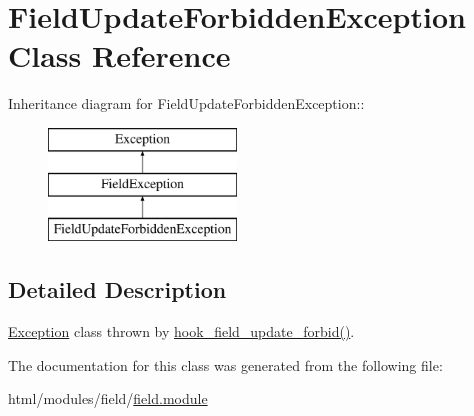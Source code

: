 \hypertarget{classFieldUpdateForbiddenException}{
\section{FieldUpdateForbiddenException Class Reference}
\label{classFieldUpdateForbiddenException}
}
Inheritance diagram for FieldUpdateForbiddenException::\begin{figure}[H]
\begin{center}
\leavevmode
\includegraphics[height=3cm]{classFieldUpdateForbiddenException}
\end{center}
\end{figure}


\subsection{Detailed Description}
\hyperlink{classException}{Exception} class thrown by \hyperlink{group__field__crud_ga7bd0ccd40a9a3690b697b68d03f660a4}{hook\_\-field\_\-update\_\-forbid()}. 

The documentation for this class was generated from the following file:\begin{DoxyCompactItemize}
\item 
html/modules/field/\hyperlink{field_8module}{field.module}\end{DoxyCompactItemize}
